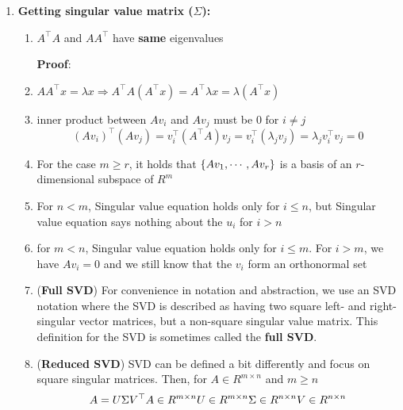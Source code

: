 \begin{enumerate}
\begin{enumerate}
        \vspace{0.5cm}
        \item \textbf{Getting singular value matrix ($\Sigma$):}
        \begin{enumerate}
            \item $A^\top A$ and $AA^\top$ have \textbf{same} eigenvalues

            \vspace{0.5cm}
            \textbf{Proof}:
            \item $AA^\top x = \lambda x \Rightarrow A^\top A(A^\top x) = A^\top \lambda x = \lambda (A^\top x)$

            \item inner product between $Av_i$ and $Av_j$ must be $0$ for $i \neq j$
            \[
                (Av_i)^\top(Av_j) = v_i^\top (A^\top A)v_j = v_i^\top(\lambda_jv_j) = \lambda_jv_i^\top v_j = 0
            \]

            \item For the case $m \geq r$, it holds that $\left\{Av_1, \cdots , Av_r\right\}$ is a basis of an $r$-dimensional subspace of $R^m$

            \item For $n < m$, Singular value equation holds only for $i \leq  n$, but Singular value equation says nothing about the $u_i$ for $i > n$

            \item for $m < n$, Singular value equation holds only for $i \leq  m$. For $i > m$, we have $Av_i = 0$ and we still know that the $v_i$ form an orthonormal set

            \item (\textbf{Full SVD}) For convenience in notation and abstraction, we use an SVD notation where the SVD is described as having two square left- and right-singular vector matrices, but a non-square singular value matrix. This definition for the SVD is sometimes called the \textbf{full SVD}.

            \item (\textbf{Reduced SVD}) SVD can be defined a bit differently and focus on square singular matrices. Then, for $A \in R^{m\times n}$ and $m \geq n$
            \[
                \hfill
                A = U\Sigma V^\top
                \hfill
                A \in  R^{m\times n}
                \hfill
                U \in  R^{m\times n}
                \hfill
                \Sigma  \in  R^{n\times n}
                \hfill
                V \in  R^{n\times n}
                \hfill
            \]


\end{enumerate}
\end{enumerate}
\end{enumerate}
